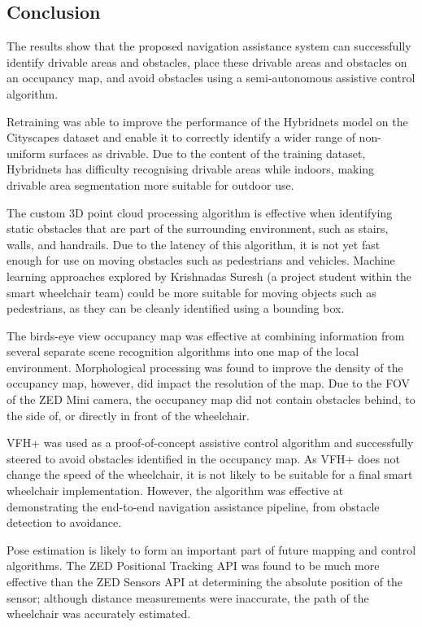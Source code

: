 \subsection{Conclusion}
The results show that the proposed navigation assistance system
can successfully identify drivable areas and obstacles,
place these drivable areas and obstacles on an occupancy map, and avoid obstacles
using a semi-autonomous assistive control algorithm.

Retraining was able to improve the performance of the Hybridnets model on the Cityscapes dataset
and enable it to correctly identify a wider range of non-uniform surfaces as drivable.
Due to the content of the training dataset, Hybridnets has difficulty
recognising drivable areas while indoors, making drivable area segmentation
more suitable for outdoor use.

The custom 3D point cloud processing algorithm is effective when identifying static
obstacles that are part of the surrounding environment, such as stairs, walls,
and handrails. Due to the latency of this algorithm, it is not yet fast enough
for use on moving obstacles such as pedestrians and vehicles.
Machine learning approaches explored by Krishnadas Suresh
(a project student within the smart wheelchair team) could be more suitable
for moving objects such as pedestrians, as they can be cleanly identified using
a bounding box.

The birds-eye view occupancy map was effective at combining information
from several separate scene recognition algorithms into one
map of the local environment. Morphological processing was found
to improve the density of the occupancy map, however, did impact the resolution
of the map. Due to the FOV of the ZED Mini camera, the occupancy map
did not contain obstacles behind, to the side of, or directly in front
of the wheelchair.

VFH+ was used as a proof-of-concept assistive control algorithm and successfully
steered to avoid obstacles identified in the occupancy map. As VFH+ does not change
the speed of the wheelchair, it is not likely to be suitable for a final smart wheelchair
implementation. However, the algorithm was effective at demonstrating the end-to-end
navigation assistance pipeline, from obstacle detection to avoidance.

Pose estimation is likely to form an important part of future mapping and control algorithms.
The ZED Positional Tracking API was found to be much more effective
than the ZED Sensors API at determining the absolute position of the
sensor; although distance measurements were inaccurate,
the path of the wheelchair was accurately estimated.

